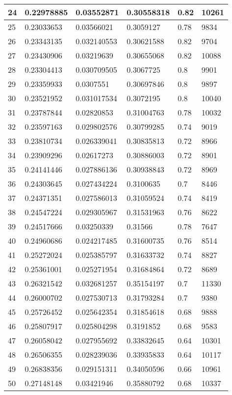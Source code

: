 \begin{longtable}{|l|l|l|l|l|l|}
24 & 0.22978885 & 0.03552871 & 0.30558318 & 0.82 & 10261 \\ \hline 
25 & 0.23033653 & 0.03566021 & 0.3059127 & 0.78 & 9834 \\ \hline 
26 & 0.23343135 & 0.032140553 & 0.30621588 & 0.82 & 9704 \\ \hline 
27 & 0.23430906 & 0.03219639 & 0.30655068 & 0.82 & 10088 \\ \hline 
28 & 0.23304413 & 0.030709505 & 0.3067725 & 0.8 & 9901 \\ \hline 
29 & 0.23359933 & 0.0307551 & 0.30697846 & 0.8 & 9897 \\ \hline 
30 & 0.23521952 & 0.031017534 & 0.3072195 & 0.8 & 10040 \\ \hline 
31 & 0.23787844 & 0.02820853 & 0.31004763 & 0.78 & 10032 \\ \hline 
32 & 0.23597163 & 0.029802576 & 0.30799285 & 0.74 & 9019 \\ \hline 
33 & 0.23810734 & 0.026339041 & 0.30835813 & 0.72 & 8966 \\ \hline 
34 & 0.23909296 & 0.02617273 & 0.30886003 & 0.72 & 8901 \\ \hline 
35 & 0.24141446 & 0.027886136 & 0.30938843 & 0.72 & 8969 \\ \hline 
36 & 0.24303645 & 0.027434224 & 0.3100635 & 0.7 & 8446 \\ \hline 
37 & 0.24371351 & 0.027586013 & 0.31059524 & 0.74 & 8419 \\ \hline 
38 & 0.24547224 & 0.029305967 & 0.31531963 & 0.76 & 8622 \\ \hline 
39 & 0.24517666 & 0.03250339 & 0.31566 & 0.78 & 7647 \\ \hline 
40 & 0.24960686 & 0.024217485 & 0.31600735 & 0.76 & 8514 \\ \hline 
41 & 0.25272024 & 0.025385797 & 0.31633732 & 0.74 & 8827 \\ \hline 
42 & 0.25361001 & 0.025271954 & 0.31684864 & 0.72 & 8689 \\ \hline 
43 & 0.26321542 & 0.032681257 & 0.35154197 & 0.7 & 11330 \\ \hline 
44 & 0.26000702 & 0.027530713 & 0.31793284 & 0.7 & 9380 \\ \hline 
45 & 0.25726452 & 0.025642354 & 0.31854618 & 0.68 & 9888 \\ \hline 
46 & 0.25807917 & 0.025804298 & 0.3191852 & 0.68 & 9583 \\ \hline 
47 & 0.26058042 & 0.027955692 & 0.33832645 & 0.64 & 10301 \\ \hline 
48 & 0.26506355 & 0.028239036 & 0.33935833 & 0.64 & 10117 \\ \hline 
49 & 0.26838356 & 0.029151311 & 0.34050596 & 0.66 & 10961 \\ \hline 
50 & 0.27148148 & 0.03421946 & 0.35880792 & 0.68 & 10337 \\ \hline 
\end{longtable}